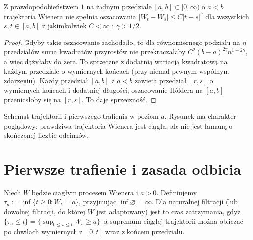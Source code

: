 \begin{wniosek}
Z prawdopodobieństwem $1$ na żadnym przedziale
$[a,b]\subset[0,\infty)$ o $a<b$ trajektoria Wienera
nie spełnia oszacowania
$|W_t-W_s|\le C|t-s|^\gamma$ dla wszystkich $s,t\in[a,b]$
z jakimkolwiek $C<\infty$ i $\gamma>1/2$.
\end{wniosek}
\begin{proof}
Gdyby takie oszacowanie zachodziło, to dla równomiernego
podziału na $n$ przedziałów suma kwadratów przyrostów
nie przekraczałaby $C^2(b-a)^{2\gamma}n^{1-2\gamma}$,
a więc dążyłaby do zera. To sprzeczne z dodatnią
wariacją kwadratową na każdym przedziale o wymiernych
końcach (przy niemal pewnym wspólnym zdarzeniu).
Każdy przedział $[a,b]$ z $a<b$ zawiera przedział
$[r,s]$ o wymiernych końcach i dodatniej długości;
oszacowanie H\"oldera na $[a,b]$ przeniosłoby się na
$[r,s]$. To daje sprzeczność.
\end{proof}

\begin{center}
\par\smallskip\small Schemat trajektorii i pierwszego trafienia w poziom $a$.
Rysunek ma charakter poglądowy: prawdziwa trajektoria Wienera
jest ciągła, ale nie jest łamaną o skończonej liczbie odcinków.
\end{center}

\section{Pierwsze trafienie i zasada odbicia}
\begin{definicja}
Niech $W$ będzie ciągłym procesem Wienera i $a>0$.
Definiujemy $\tau_a:=\inf\{t\ge0:W_t=a\}$,
przyjmując $\inf\varnothing=\infty$.
Dla naturalnej filtracji (lub dowolnej filtracji, do której
$W$ jest adaptowany) jest to czas zatrzymania, gdyż
$\{\tau_a\le t\}=\{\sup_{0\le s\le t}W_s\ge a\}$,
a supremum ciągłej trajektorii można obliczać po
chwilach wymiernych z $[0,t]$ wraz z końcem przedziału.
\end{definicja}


